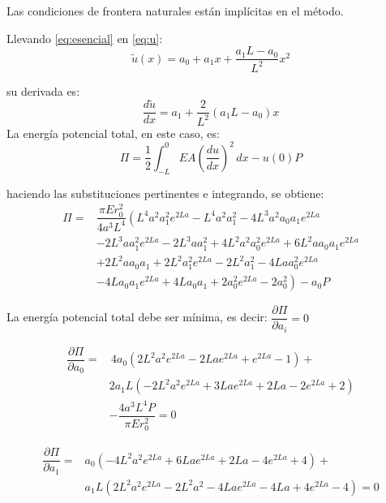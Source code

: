\begin{example}
\begin{enumerate}[label=\textbf{\arabic*}.]
	Las condiciones de frontera naturales están implícitas en el método.
	
	Llevando \eqref{eq:esencial} en \eqref{eq:u}:
	\begin{equation}
		\tilde{u}(x) = a_{0} + a_1 x + \dfrac{a_1L - a_0}{L^2} x^{2}
		\label{eq:u2}
	\end{equation}
	
	su derivada es:
	\begin{equation}
		\dfrac{d\tilde{u}}{dx} = a_1 + \dfrac{2}{L^2} \left(a_1L - a_0\right) x
		\label{eq:du}
	\end{equation}
	La energía potencial total, en este caso, es:
	$$
	\Pi = \dfrac{1}{2} \int_{-L}^0 EA \left( \dfrac{du}{dx} \right)^2 \, dx - u(0) P
	$$
	
	haciendo las substituciones pertinentes e integrando, se obtiene:
	\begin{equation}
		\begin{split}
			\Pi =& \dfrac{\pi Er_0^2}{4a^3L^4} \left( L^{4} a^{2} a_{1}^{2} e^{2 L a} - L^{4} a^{2} a_{1}^{2} - 4 L^{3} a^{2} a_{0} a_{1} e^{2 L a} \right.\\[1mm] & - 2 L^{3} a a_{1}^{2} e^{2 L a} - 2 L^{3} a a_{1}^{2} + 4 L^{2} a^{2} a_{0}^{2} e^{2 L a} + 6 L^{2} a a_{0} a_{1} e^{2 L a} \\[1mm] & + 2 L^{2} a a_{0} a_{1} + 2 L^{2} a_{1}^{2} e^{2 L a} - 2 L^{2} a_{1}^{2} - 4 L a a_{0}^{2} e^{2 L a} \\[1mm] & \left. - 4 L a_{0} a_{1} e^{2 L a} + 4 L a_{0} a_{1} + 2 a_{0}^{2} e^{2 L a} - 2 a_{0}^{2} \right) - a_0P
		\end{split}
	\end{equation}
	
	La energía potencial total debe ser mínima, es decir: $\dfrac{\partial \Pi}{\partial a_i} = 0$ 
	
	\begin{equation}
		\begin{split}
			\dfrac{\partial \Pi}{\partial a_0} =& \, 4a_{0} \left(2 L^{2} a^{2} e^{2 L a} - 2 L a e^{2 L a} + e^{2 L a} - 1 \right) + \\
			& 2a_{1}L \left(- 2 L^{2} a^{2} e^{2 L a} + 3 L a e^{2 L a} + 2 L a - 2 e^{2 L a} + 2 \right) \\ & - \dfrac{4a^3L^4P}{\pi E r_0^2} = 0
		\end{split}
		\label{eq:dPi0}
	\end{equation}
	
	\begin{equation}
		\begin{split}
			\dfrac{\partial \Pi}{\partial a_1} = &
			a_{0} \left(- 4 L^{2} a^{2} e^{2 L a} + 6 L a e^{2 L a} + 2 L a - 4 e^{2 L a} + 4 \right) + \\ & a_{1}L \left(2 L^{2} a^{2} e^{2 L a} - 2 L^{2} a^{2} - 4 L a e^{2 L a} - 4 L a + 4 e^{2 L a} - 4 \right) = 0
		\end{split}
		\label{eq:dPi1}
	\end{equation}
	

\end{enumerate}
\end{example}
